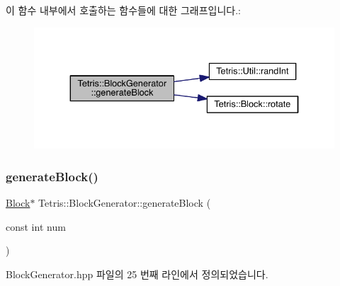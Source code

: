 이 함수 내부에서 호출하는 함수들에 대한 그래프입니다.\+:
\nopagebreak
\begin{figure}[H]
\begin{center}
\leavevmode
\includegraphics[width=334pt]{d3/d50/class_tetris_1_1_block_generator_a581b22cebe170d3fe8b51130c01e7a22_cgraph}
\end{center}
\end{figure}
\mbox{\label{class_tetris_1_1_block_generator_a584fde2bfe1cdd4505bd905befd73d21}} 
\subsubsection{\texorpdfstring{generate\+Block()}{generateBlock()}\hspace{0.1cm}{\footnotesize\ttfamily [2/2]}}
{\footnotesize\ttfamily \hyperlink{class_tetris_1_1_block}{Block}$\ast$ Tetris\+::\+Block\+Generator\+::generate\+Block (\begin{DoxyParamCaption}\item[{const int}]{num }\end{DoxyParamCaption})\hspace{0.3cm}{\ttfamily [inline]}}



Block\+Generator.\+hpp 파일의 25 번째 라인에서 정의되었습니다.


